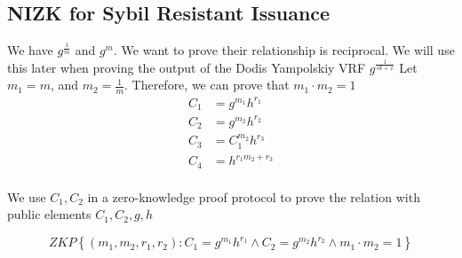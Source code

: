 \subsection{NIZK for Sybil Resistant Issuance}
We have $g^{\frac{1}{m}}$ and $g^m$. We want to prove their relationship is reciprocal. We will use this later when proving the output of the Dodis Yampolskiy VRF $g^{\frac{1}{sk + x}}$
Let $m_1 = m$, and $m_2 = \frac{1}{m}$. Therefore, we can prove that $m_1 \cdot m_2 = 1$ 
\[ 
    \begin{aligned}
        C_1 &= g^{m_1}h^{r_1} \\
        C_2 &= g^{m_2}h^{r_2} \\
        C_3 &= C_1^{m_2}h^{r_3} \\ 
        C_4 &= h^{r_1m_2 + r_3} \\ 
    \end{aligned}
\]

We use $C_1, C_2$ in a zero-knowledge proof protocol to prove the relation with public elements $C_1, C_2, g, h$

\[
ZKP
    \left\{ 
    (m_1, m_2, r_1, r_2): C_1 = g^{m_1}h^{r_1} \wedge C_2 = g^{m_2}h^{r_2} \wedge m_1 \cdot m_2 = 1
    \right\}
\]

